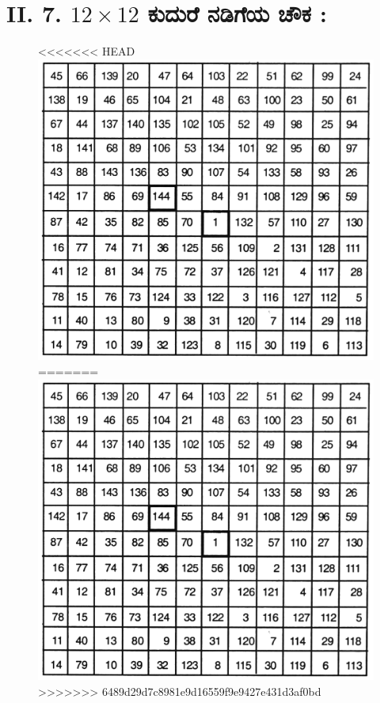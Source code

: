 \section*{II. 7. $12 \times 12$ ಕುದುರೆ ನಡಿಗೆಯ ಚೌಕ :}

\begin{figure}[H]
<<<<<<< HEAD
\includegraphics{src/figures/chap6/fig6-10.jpg}
=======
\includegraphics[scale=0.8]{src/figures/chap6/fig6.10.jpg}
>>>>>>> 6489d29d7c8981e9d16559f9e9427e431d3af0bd
\end{figure}

